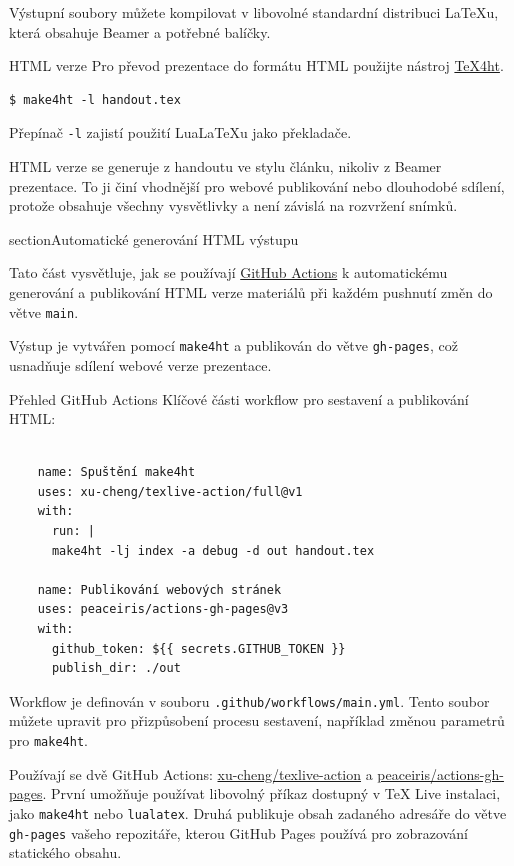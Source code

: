 Výstupní soubory můžete kompilovat v libovolné standardní distribuci \LaTeX{}u, která obsahuje Beamer a potřebné balíčky.

\begin{frame}[fragile]{HTML verze}
Pro převod prezentace do formátu HTML použijte nástroj \href{https://www.tug.org/tex4ht/}{\TeX4ht}.
\begin{verbatim}
$ make4ht -l handout.tex\end{verbatim}

Přepínač \verb|-l| zajistí použití Lua\LaTeX{}u jako překladače.
\end{frame}

HTML verze se generuje z handoutu ve stylu článku, nikoliv z Beamer prezentace.
To ji činí vhodnější pro webové publikování nebo dlouhodobé sdílení, protože
obsahuje všechny vysvětlivky a není závislá na rozvržení snímků.

section{Automatické generování HTML výstupu}

Tato část vysvětluje, jak se používají \href{https://docs.github.com/en/actions/writing-workflows/quickstart}{GitHub Actions} k automatickému generování a publikování HTML verze materiálů při každém pushnutí změn do větve \texttt{main}.

Výstup je vytvářen pomocí \texttt{make4ht} a publikován do větve \texttt{gh-pages}, což usnadňuje sdílení webové verze prezentace.

\begin{frame}[fragile]{Přehled GitHub Actions}
Klíčové části workflow pro sestavení a publikování HTML:

\begin{verbatim}

    name: Spuštění make4ht
    uses: xu-cheng/texlive-action/full@v1
    with:
      run: |
      make4ht -lj index -a debug -d out handout.tex

    name: Publikování webových stránek
    uses: peaceiris/actions-gh-pages@v3
    with:
      github_token: ${{ secrets.GITHUB_TOKEN }}
      publish_dir: ./out
\end{verbatim}

\end{frame}

Workflow je definován v souboru \texttt{.github/workflows/main.yml}.
Tento soubor můžete upravit pro přizpůsobení procesu sestavení, například změnou parametrů pro \texttt{make4ht}.

Používají se dvě GitHub Actions: \href{https://github.com/xu-cheng/texlive-action}{xu-cheng/texlive-action}
a \href{https://github.com/peaceiris/actions-gh-pages}{peaceiris/actions-gh-pages}.
První umožňuje používat libovolný příkaz dostupný v TeX Live instalaci, jako \texttt{make4ht} nebo \texttt{lualatex}.
Druhá publikuje obsah zadaného adresáře do větve \texttt{gh-pages} vašeho repozitáře,
kterou GitHub Pages používá pro zobrazování statického obsahu.

